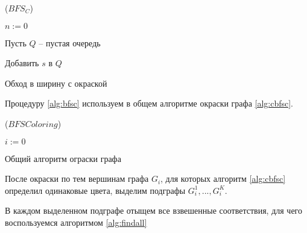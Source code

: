 \begin{algorithm}[H]
	\Large
	\Begin($BFS_C$){
		$n := 0$
		
		Пусть $Q$ -- пустая очередь
		
		Добавить $s$ в $Q$
		
		
	}
	
	\caption{Обход в ширину с окраской}
	\label{alg:bfsc}
\end{algorithm}

Процедуру \ref{alg:bfsc} используем в общем алгоритме окраски графа \ref{alg:cbfsc}.

\begin{algorithm}[H]
	\Large
	\Begin($BFS Coloring$){
		
		
		$i := 0$
		
		
	}
	
	\caption{Общий алгоритм ограски графа}
	\label{alg:cbfsc}
\end{algorithm}

После окраски по тем вершинам графа $G_i$, для которых алгоритм \ref{alg:cbfsc} определил одинаковые цвета, выделим подграфы $G_i^1, ..., G_i^K$.

В каждом выделенном подграфе отыщем все взвешенные соответствия, для чего воспользуемся алгоритмом \ref{alg:findall}

